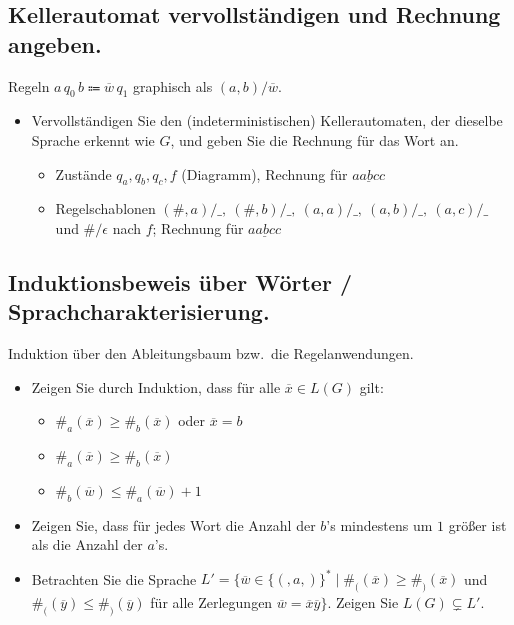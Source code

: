 \subsection{Kellerautomat vervollständigen und Rechnung angeben.}
Regeln $a\,q_0\,b\Coloneqq\overline{w}\,q_1$ graphisch als $(a,b)/\overline{w}$.
\begin{itemize}
    \item Vervollständigen Sie den (indeterministischen) Kellerautomaten, der dieselbe Sprache erkennt wie $G$,
    und geben Sie die Rechnung für das Wort an.
    \begin{itemize}
        \item Zustände $q_a,q_b,q_c,f$ (Diagramm), Rechnung für $\underline{aabcc}$ 
        \item  Regelschablonen $(\#,a)/\_,\ (\#,b)/\_,\ (a,a)/\_,\ (a,b)/\_,\ (a,c)/\_$ und $\#/\epsilon$ nach $f$;
        Rechnung für $\underline{aabcc}$ 
    \end{itemize}
\end{itemize}

\subsection{Induktionsbeweis über Wörter / Sprachcharakterisierung.}
Induktion über den Ableitungsbaum bzw.\ die Regelanwendungen.
\begin{itemize}
    \item Zeigen Sie durch Induktion, dass für alle $\overline{x}\in L(G)$ gilt:
    \begin{itemize}
        \item  $\#_a(\overline{x})\ge\#_b(\overline{x})$ \; oder \; $\overline{x}=b$ 
        \item $\#_a(\overline{x})\ge\#_b(\overline{x})$ 
        \item $\#_b(\overline{w})\le\#_a(\overline{w})+1$ 
    \end{itemize}
    \item Zeigen Sie, dass für jedes Wort die Anzahl der $b$'s mindestens um $1$ größer ist als die Anzahl der $a$'s. 
    \item Betrachten Sie die Sprache $L'=\{\overline{w}\in\{(,a,)\}^*\mid \#_((\overline{x})\ge\#_)(\overline{x})$ und
    $\#_((\overline{y})\le\#_)(\overline{y})$ für alle Zerlegungen $\overline{w}=\overline{x}\overline{y}\}$.
    Zeigen Sie $L(G)\subsetneq L'$. 
\end{itemize}

